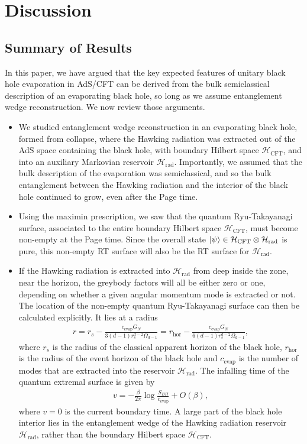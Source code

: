 \documentclass[11pt,a4paper]{article}
\begin{document}
\section{Discussion} \label{sec:discuss}

\subsection{Summary of Results}
In this paper, we have argued that the key expected features of unitary black hole evaporation in AdS/CFT can be derived from the bulk semiclassical description of an evaporating black hole, so long as we assume entanglement wedge reconstruction. We now review those arguments.
\begin{itemize}

\item We studied entanglement wedge reconstruction in an evaporating black hole, formed from collapse, where the Hawking radiation was extracted out of the AdS space containing the black hole, with boundary Hilbert space $\mathcal{H}_\text{CFT}$, and into an auxiliary Markovian reservoir $\mathcal{H}_\text{rad}$. Importantly, we assumed that the bulk description of the evaporation was semiclassical, and so the bulk entanglement between the Hawking radiation and the interior of the black hole continued to grow, even after the Page time.

\item Using the maximin prescription, we saw that the quantum Ryu-Takayanagi surface, associated to the entire boundary Hilbert space $\mathcal{H}_\text{CFT}$, must become non-empty at the Page time. Since the overall state $\ket{\psi} \in \mathcal{H}_\text{CFT} \otimes \mathcal{H}_\text{rad}$ is pure, this non-empty RT surface will also be the RT surface for $\mathcal{H}_\text{rad}$.

\item If the Hawking radiation is extracted into $\mathcal{H}_\text{rad}$ from deep inside the zone, near the horizon, the greybody factors will all be either zero or one, depending on whether a given angular momentum mode is extracted or not. The location of the non-empty quantum Ryu-Takayanagi surface can then be calculated explicitly. It lies at a radius
\begin{align}
r = r_s -  \frac{c_\text{evap} G_N}{3 (d-1) r_s^{d-2} \Omega_{d-1}} = r_\text{hor} -  \frac{c_\text{evap} G_N}{6 (d-1) r_s^{d-2} \Omega_{d-1}},
\end{align}
where $r_s$ is the radius of the classical apparent horizon of the black hole, $r_\text{hor}$ is the radius of the event horizon of the black hole and $c_\text{evap}$ is the number of modes that are extracted into the reservoir $\mathcal{H}_\text{rad}$. The infalling time of the quantum extremal surface is given by
\begin{align}
v = - \frac{\beta}{2 \pi} \log\frac{S_{BH}}{c_\text{evap}} + O(\beta),
\end{align}
where $v=0$ is the current boundary time. A large part of the black hole interior lies in the entanglement wedge of the Hawking radiation reservoir $\mathcal{H}_\text{rad}$, rather than the boundary Hilbert space $\mathcal{H}_\text{CFT}$.


\end{itemize}
\end{document}
